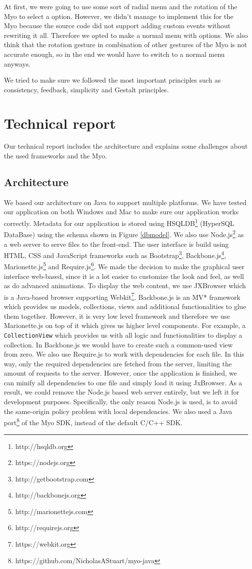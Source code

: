 \documentclass{article}
\begin{document}
At first, we were going to use some sort of radial menu and the rotation of the Myo to select a option. However, we didn't manage to implement this for the Myo because the source code did not support adding custom events without rewriting it all. Therefore we opted to make a normal menu with options. We also think that the rotation gesture in combination of other gestures of the Myo is not accurate enough, so in the end we would have to switch to a normal menu anyways.

We tried to make sure we followed the most important principles such as consistency, feedback, simplicity and Gestalt principles.

\section{Technical report}

Our technical report includes the architecture and explains some challenges about the used frameworks and the Myo.
\subsection{Architecture}

We based our architecture on Java to support multiple platforms. We have tested our application on both Windows and Mac to make sure our application works correctly. Metadata for our application is stored using HSQLDB\footnote{http://hsqldb.org} (HyperSQL DataBase) using the schema shown in Figure \ref{dbmodel}. We also use Node.js\footnote{https://nodejs.org} as a web server to serve files to the front-end.  The user interface is build using HTML, CSS and JavaScript frameworks such as Bootstrap\footnote{http://getbootstrap.com}, Backbone.js\footnote{http://backbonejs.org}, Marionette.js\footnote{http://marionettejs.com} and Require.js\footnote{http://requirejs.org}. We made the decision to make the graphical user interface web-based, since it is a lot easier to customize the look and feel, as well as do advanced animations. To display the web content, we use JXBrowser which is a Java-based browser supporting Webkit\footnote{https://webkit.org}. Backbone.js is an MV* framework which provides us models, collections, views and additional functionalities to glue them together. However, it is very low level framework and therefore we use Marionette.js on top of it which gives us higher level components. For example, a \texttt{CollectionView} which provides us with all logic and functionalities to display a collection. In Backbone.js we would have to create such a common-used view from zero. We also use Require.js to work with dependencies for each file. In this way, only the required dependencies are fetched from the server, limiting the amount of requests to the server. However, once the application is finished, we can minify all dependencies to one file and simply load it using JxBrowser. As a result, we could remove the Node.js based web server entirely, but we left it for development purposes. Specifically, the only reason Node.js is used, is to avoid the same-origin policy problem with local dependencies. We also used a Java port\footnote{https://github.com/NicholasAStuart/myo-java} of the Myo SDK, instead of the default C/C++ SDK.
\end{document}
